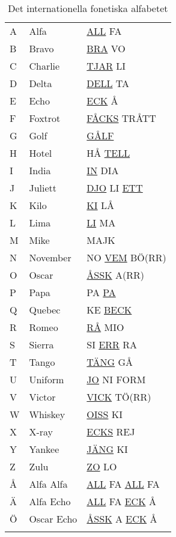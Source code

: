 \begin{table}[htbp]
  \label{tab:bokstavering-internationell}
  \caption{Det internationella fonetiska alfabetet}
  \begin{tabular}{lll}
    A & Alfa  & \underline{ALL} FA \\
    B & Bravo & \underline{BRA} VO \\
    C & Charlie & \underline{TJAR} LI \\
    D & Delta & \underline{DELL} TA \\
    E & Echo & \underline{ECK} Å \\
    F & Foxtrot & \underline{FÅCKS} TRÅTT \\
    G & Golf & \underline{GÅLF} \\
    H & Hotel & HÅ \underline{TELL} \\
    I & India & \underline{IN} DIA \\
    J & Juliett & \underline{DJO} LI \underline{ETT} \\
    K & Kilo & \underline{KI} LÅ \\
    L & Lima & \underline{LI} MA \\
    M & Mike & MAJK \\
    N & November & NO \underline{VEM} BÖ(RR) \\
    O & Oscar & \underline{ÅSSK} A(RR) \\
    P & Papa & PA \underline{PA} \\
    Q & Quebec & KE \underline{BECK} \\
    R & Romeo & \underline{RÅ} MIO \\
    S & Sierra & SI \underline{ERR} RA \\
    T & Tango & \underline{TÄNG} GÅ \\
    U & Uniform & \underline{JO} NI FORM \\
    V & Victor & \underline{VICK} TÖ(RR) \\
    W & Whiskey & \underline{OISS} KI \\
    X & X-ray & \underline{ECKS} REJ \\
    Y & Yankee & \underline{JÄNG} KI \\
    Z & Zulu & \underline{ZO} LO \\
    Å & Alfa Alfa & \underline{ALL} FA \underline{ALL} FA \\
    Ä & Alfa Echo & \underline{ALL} FA \underline{ECK} Å \\
    Ö & Oscar Echo & \underline{ÅSSK} A \underline{ECK} Å \\
    & & \\

\end{tabular}
\end{table}
